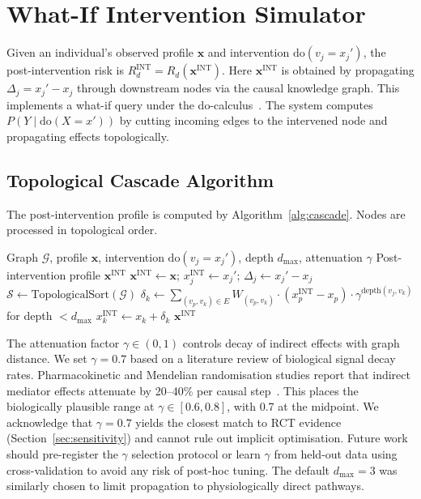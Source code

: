 \documentclass[runningheads]{llncs}
\begin{document}
\section{What-If Intervention Simulator}\label{sec:whatif}

Given an individual's observed profile $\mathbf{x}$ and intervention
$\mathrm{do}(v_j = x_j')$, the post-intervention risk is
$R_d^{\mathrm{INT}} = R_d(\mathbf{x}^{\mathrm{INT}})$.
Here $\mathbf{x}^{\mathrm{INT}}$ is obtained by propagating
$\Delta_j = x_j' - x_j$ through downstream nodes via the causal
knowledge graph.
This implements a what-if query under the
do-calculus~\cite{pearl2009causality}.
The system computes $P(Y \mid \mathrm{do}(X = x'))$ by cutting
incoming edges to the intervened node and propagating effects
topologically.

\subsection{Topological Cascade Algorithm}\label{sec:cascade}

The post-intervention profile is computed by
Algorithm~\ref{alg:cascade}.
Nodes are processed in topological order.

\begin{algorithm}[t]
\caption{Topological Intervention Cascade}
\label{alg:cascade}
\begin{algorithmic}[1]
\REQUIRE Graph $\mathcal{G}$, profile $\mathbf{x}$, intervention
  $\mathrm{do}(v_j = x_j')$, depth $d_{\max}$, attenuation $\gamma$
\ENSURE Post-intervention profile $\mathbf{x}^{\mathrm{INT}}$
\STATE $\mathbf{x}^{\mathrm{INT}} \leftarrow \mathbf{x}$;
  $x_j^{\mathrm{INT}} \leftarrow x_j'$;
  $\Delta_j \leftarrow x_j' - x_j$
\STATE $\mathcal{S} \leftarrow \text{TopologicalSort}(\mathcal{G})$
  \STATE $\delta_k \leftarrow \sum_{(v_p, v_k) \in E} W_{(v_p,v_k)} \cdot (x_p^{\mathrm{INT}} - x_p) \cdot \gamma^{\text{depth}(v_j,v_k)}$ for depth $< d_{\max}$
  \STATE $x_k^{\mathrm{INT}} \leftarrow x_k + \delta_k$
\ENDFOR
\RETURN $\mathbf{x}^{\mathrm{INT}}$
\end{algorithmic}
\end{algorithm}

The attenuation factor $\gamma \in (0,1)$ controls decay of indirect
effects with graph distance.
We set $\gamma = 0.7$ based on a literature review of biological
signal decay rates.
Pharmacokinetic and Mendelian randomisation studies report that
indirect mediator effects attenuate by 20--40\% per causal
step~\cite{ctt2010,pearl2009causality}.
This places the biologically plausible range at
$\gamma \in [0.6, 0.8]$, with 0.7 at the midpoint.
We acknowledge that $\gamma = 0.7$ yields the closest match to RCT
evidence (Section~\ref{sec:sensitivity}) and cannot rule out
implicit optimisation.
Future work should pre-register the $\gamma$ selection protocol or
learn $\gamma$ from held-out data using cross-validation to avoid
any risk of post-hoc tuning.
The default $d_{\max} = 3$ was similarly chosen to limit
propagation to physiologically direct pathways.
\end{document}

